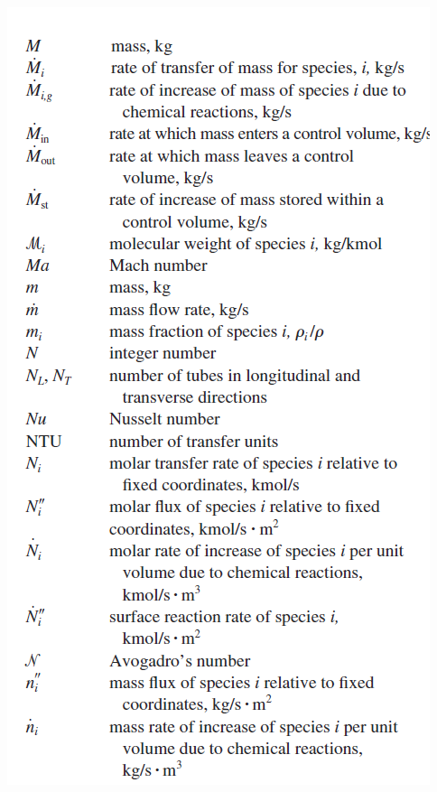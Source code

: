 \documentclass[10pt,landscape]{article}
\newenvironment{Figure}
     {\par\medskip\noindent\minipage{\linewidth}}
     {\endminipage\par\medskip}
\begin{document}
\begin{multicols}{3}
\begin{Figure}
    \includegraphics[width=\linewidth]{Symbols_3.png}
\end{Figure}
\begin{Figure}
    \centering

\end{Figure}
\end{multicols}
\end{document}
